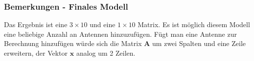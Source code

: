 {\subsubsection{Bemerkungen - Finales Modell}
%
Das Ergebnis ist eine $3\times10$ und eine $1\times10$ Matrix. Es ist möglich diesem Modell eine beliebige Anzahl an Antennen hinzuzufügen. Fügt man eine Antenne zur Berechnung hinzufügen würde sich die Matrix $\mathbf{A}$ um zwei Spalten und eine Zeile erweitern, der Vektor $\mathbf{x}$ analog um 2 Zeilen.

}